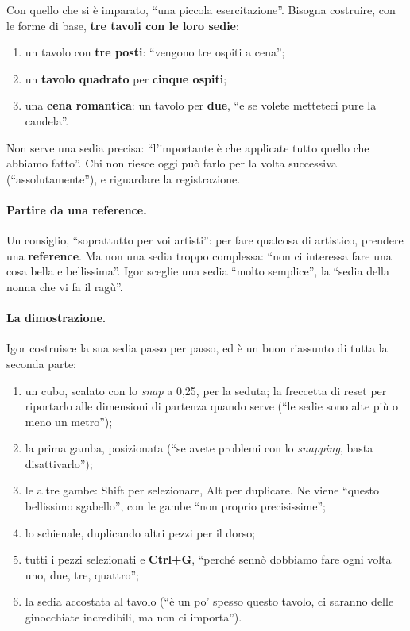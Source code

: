 Con quello che si è imparato, ``una piccola esercitazione''. Bisogna costruire, con le
forme di base, \textbf{tre tavoli con le loro sedie}:
\begin{enumerate}
  \item un tavolo con \textbf{tre posti}: ``vengono tre ospiti a cena'';
  \item un \textbf{tavolo quadrato} per \textbf{cinque ospiti};
  \item una \textbf{cena romantica}: un tavolo per \textbf{due}, ``e se volete
        metteteci pure la candela''.
\end{enumerate}
Non serve una sedia precisa: ``l'importante è che applicate tutto quello che abbiamo
fatto''. Chi non riesce oggi può farlo per la volta successiva (``assolutamente''), e
riguardare la registrazione.

\paragraph{Partire da una reference.} Un consiglio, ``soprattutto per voi artisti'': per
fare qualcosa di artistico, prendere una \textbf{reference}. Ma non una sedia troppo
complessa: ``non ci interessa fare una cosa bella e bellissima''. Igor sceglie una
sedia ``molto semplice'', la ``sedia della nonna che vi fa il ragù''.

\paragraph{La dimostrazione.} Igor costruisce la sua sedia passo per passo, ed è un buon
riassunto di tutta la seconda parte:
\begin{enumerate}
  \item un cubo, scalato con lo \emph{snap} a 0,25, per la seduta; la freccetta di reset
        per riportarlo alle dimensioni di partenza quando serve (``le sedie sono alte
        più o meno un metro'');
  \item la prima gamba, posizionata (``se avete problemi con lo \emph{snapping}, basta
        disattivarlo'');
  \item le altre gambe: Shift per selezionare, Alt per duplicare. Ne viene ``questo
        bellissimo sgabello'', con le gambe ``non proprio precisissime'';
  \item lo schienale, duplicando altri pezzi per il dorso;
  \item tutti i pezzi selezionati e \textbf{Ctrl+G}, ``perché sennò dobbiamo fare ogni
        volta uno, due, tre, quattro'';
  \item la sedia accostata al tavolo (``è un po' spesso questo tavolo, ci saranno delle
        ginocchiate incredibili, ma non ci importa'').
\end{enumerate}

